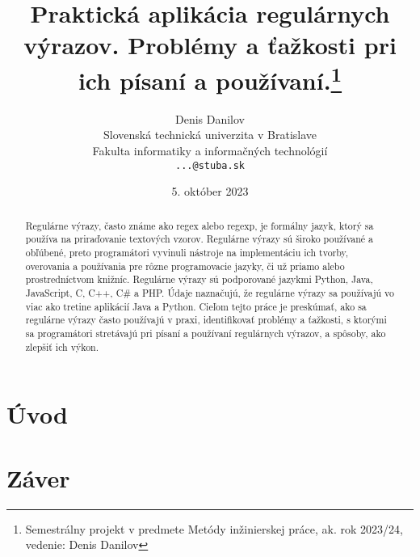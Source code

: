 \documentclass[10pt,twoside,slovak,a4paper]{article}
\title{Praktická aplikácia regulárnych výrazov. Problémy a ťažkosti pri ich písaní a používaní.\thanks{Semestrálny projekt v predmete Metódy inžinierskej práce, ak. rok 2023/24, vedenie: Denis Danilov}} %
\author{Denis Danilov\\[2pt]
	{\small Slovenská technická univerzita v Bratislave}\\
	{\small Fakulta informatiky a informačných technológií}\\
	{\small \texttt{...@stuba.sk}}
	}
\date{\small 5. október 2023} %
\begin{document}
\maketitle

\begin{abstract}
	Regulárne výrazy, často známe ako regex alebo regexp, je formálny jazyk, ktorý sa používa na priraďovanie textových vzorov. Regulárne výrazy sú široko používané a obľúbené, preto programátori vyvinuli nástroje na implementáciu ich tvorby, overovania a používania pre rôzne programovacie jazyky, či už priamo alebo prostredníctvom knižníc. Regulárne výrazy sú podporované jazykmi Python, Java, JavaScript, C, C++, C\# a PHP. Údaje naznačujú, že regulárne výrazy sa používajú vo viac ako tretine aplikácií Java a Python.
	Cieľom tejto práce je preskúmať, ako sa regulárne výrazy často používajú v praxi, identifikovať problémy a ťažkosti, s ktorými sa programátori stretávajú pri písaní a používaní regulárnych výrazov, a spôsoby, ako zlepšiť ich výkon.
\end{abstract}



\section{Úvod}



\section{Záver} \label{zaver} %






\end{document}
